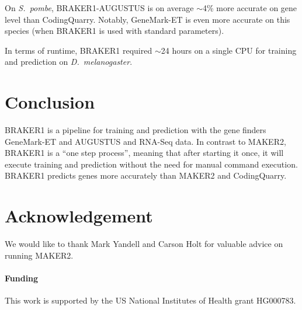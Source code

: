 \documentclass{bioinfo}
\begin{document}
On \textit{S.~pombe}, BRAKER1-AUGUSTUS is on average $\sim$4\% more accurate on gene level than CodingQuarry. Notably, GeneMark-ET is even more accurate on this species (when BRAKER1 is used with standard parameters).

In terms of runtime, BRAKER1 required $\sim$24 hours on a single CPU for training and prediction on \textit{D.~melanogaster}. 

\section{Conclusion}

BRAKER1 is a pipeline for training and prediction with the gene finders GeneMark-ET and AUGUSTUS and RNA-Seq data. In contrast to MAKER2, BRAKER1 is a ``one step process'', meaning that after starting it once, it will execute training and prediction without the need for manual command execution. BRAKER1 predicts genes more accurately than MAKER2 and CodingQuarry.

\section*{Acknowledgement}

We would like to thank Mark Yandell and Carson Holt for valuable advice on running MAKER2.

\paragraph{Funding\textcolon} This work is supported by the US National Institutes of Health grant HG000783.

%
%
%
%
%
%
%
%
%
\end{document}
